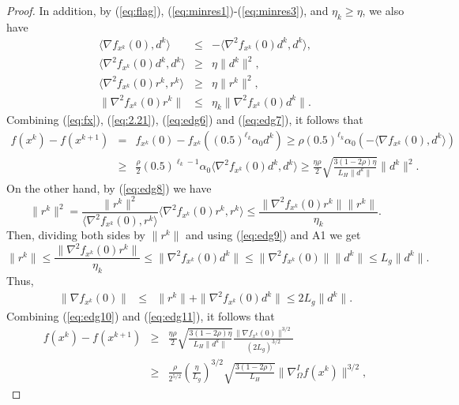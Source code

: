\documentclass[10pt,a4paper]{amsart}
\begin{document}
\begin{proof}
\normalsize
In addition, by (\ref{eq:flag}), (\ref{eq:minres1})-(\ref{eq:minres3}), and $\eta_{k}\geq\eta$, we also have 
\begin{eqnarray}
\langle\nabla f_{x^{k}}(0),d^{k}\rangle&\leq &-\langle\nabla^{2}f_{x^{k}}(0)d^{k},d^{k}\rangle,
\label{eq:edg6}\\
\langle\nabla^{2}f_{x^{k}}(0)d^{k},d^{k}\rangle&\geq&\eta\|d^{k}\|^{2},
\label{eq:edg7}\\
\langle\nabla^{2}f_{x^{k}}(0)r^{k},r^{k}\rangle&\geq&\eta\|r^{k}\|^{2},
\label{eq:edg8}\\
\|\nabla^{2}f_{x^{k}}(0)r^{k}\|&\leq&\eta_{k}\|\nabla^{2}f_{x^{k}}(0)d^{k}\|.
\label{eq:edg9}
\end{eqnarray}
Combining (\ref{eq:fx}), (\ref{eq:2.21}), (\ref{eq:edg6}) and (\ref{eq:edg7}), it follows that
\begin{eqnarray}
    f(x^{k})-f(x^{k+1})&=&f_{x^{k}}(0)-f_{x^{k}}((0.5)^{\ell_{k}}\alpha_{0}d^{k})\geq \rho (0.5)^{\ell_{k}}\alpha_{0}\left(-\langle\nabla f_{x^{k}}(0),d^{k}\rangle\right)\nonumber\\
    &\geq &\frac{\rho}{2}(0.5)^{\ell_{k}-1}\alpha_{0}\langle\nabla^{2}f_{x^{k}}(0)d^{k},d^{k}\rangle\geq \frac{\eta\rho}{2}\sqrt{\frac{3(1-2\rho)\eta}{L_{H}\|d^{k}\|}}\|d^{k}\|^{2}.
\label{eq:edg10}
\end{eqnarray}
On the other hand, by (\ref{eq:edg8}) we have
\[
\|r^{k}\|^{2}=\frac{\|r^{k}\|^{2}}{\langle\nabla^{2}f_{x^{k}}(0),r^{k}\rangle}\langle\nabla^{2}f_{x^{k}}(0)r^{k},r^{k}\rangle\leq\frac{\|\nabla^{2}f_{x^{k}}(0)r^{k}\|\|r^{k}\|}{\eta_{k}}.
\]
Then, dividing both sides by $\|r^{k}\|$ and using (\ref{eq:edg9}) and A1 we get
\[
\|r^{k}\|\leq\frac{\|\nabla^{2}f_{x^{k}}(0)r^{k}\|}{\eta_{k}}\leq\|\nabla^{2}f_{x^{k}}(0)d^{k}\|\leq\|\nabla^{2}f_{x^{k}}(0)\|\|d^{k}\|\leq L_{g}\|d^{k}\|.
\]
Thus,
\begin{eqnarray}
\|\nabla f_{x^{k}}(0)\|&\leq&
\|r^{k}\|+\|\nabla^{2}f_{x^{k}}(0)d^{k}\|\leq 2L_{g}\|d^{k}\|.
\label{eq:edg11}
\end{eqnarray}
Combining (\ref{eq:edg10}) and (\ref{eq:edg11}), it follows that
\small
\begin{eqnarray*}
    f(x^{k})-f(x^{k+1})&\geq &\frac{\eta\rho}{2}\sqrt{\frac{3(1-2\rho)\eta}{L_{H}\|d^{k}\|}}\frac{\|\nabla f_{x^{k}}(0)\|^{3/2}}{(2L_{g})^{3/2}}\\
    &\geq & \frac{\rho}{2^{5/2}}\left(\frac{\eta}{L_{g}}\right)^{3/2}\sqrt{\frac{3(1-2\rho)}{L_{H}}}\|\nabla_{\Omega}^{I}f(x^{k})\|^{3/2},
\end{eqnarray*}
\normalsize

\end{proof}
\end{document}
